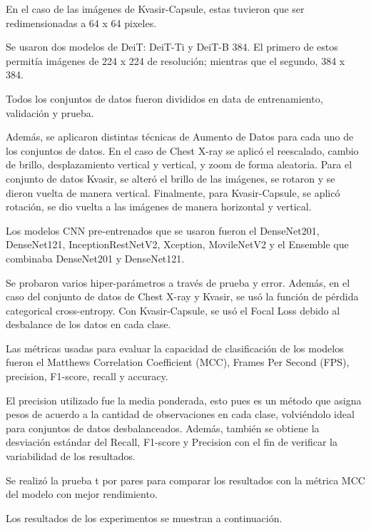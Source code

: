 En el caso de las imágenes de Kvasir-Capsule, estas tuvieron que ser redimensionadas a 64 x 64 pixeles.

Se usaron dos modelos de DeiT: DeiT-Ti y DeiT-B 384. El primero de estos permitía imágenes de 224 x 224 de resolución; mientras que el segundo, 384 x 384.

Todos los conjuntos de datos fueron divididos en data de entrenamiento, validación y prueba.

Además, se aplicaron distintas técnicas de Aumento de Datos para cada uno de los conjuntos de datos. En el caso de Chest X-ray se aplicó el reescalado, cambio de brillo, desplazamiento vertical y vertical, y zoom de forma aleatoria. Para el conjunto de datos Kvasir, se alteró el brillo de las imágenes, se rotaron y se dieron vuelta de manera vertical. Finalmente, para Kvasir-Capsule, se aplicó rotación, se dio vuelta a las imágenes de manera horizontal y vertical.

Los modelos CNN pre-entrenados que se usaron fueron el DenseNet201, DenseNet121, InceptionRestNetV2, Xception, MovileNetV2 y el Ensemble que combinaba DenseNet201 y DenseNet121.

Se probaron varios hiper-parámetros a través de prueba y error. Además, en el caso del conjunto de datos de Chest X-ray y Kvasir, se usó la función de pérdida categorical cross-entropy. Con Kvasir-Capsule, se usó el Focal Loss debido al desbalance de los datos en cada clase.

Las métricas usadas para evaluar la capacidad de clasificación de los modelos fueron el Matthews Correlation Coefficient (MCC), Frames Per Second (FPS), precision, F1-score, recall y accuracy.

El precision utilizado fue la media ponderada, esto pues es un método que asigna pesos de acuerdo a la cantidad de observaciones en cada clase, volviéndolo ideal para conjuntos de datos desbalanceados. Además, también se obtiene la desviación estándar del Recall, F1-score y Precision con el fin de verificar la variabilidad de los resultados.

Se realizó la prueba t por pares para comparar los resultados con la métrica MCC del modelo con mejor rendimiento.

Los resultados de los experimentos se muestran a continuación.

